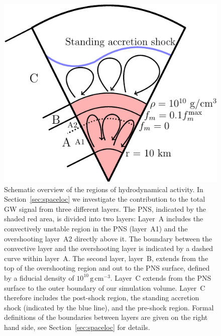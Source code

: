\begin{figure}
\includegraphics[width=0.99\linewidth]{./images/chp1/fig4.pdf}
\caption{Schematic overview of the regions of hydrodynamical activity. In
  Section~\ref{sec:spaceloc} we investigate the contribution to
  the total GW signal from three different layers. The PNS, indicated by
  the shaded red area, is divided into two layers: Layer~A includes
  the convectively unstable region in the PNS (layer~A1) and the overshooting
  layer~A2 directly above it. The boundary between the convective
  layer and the overshooting layer is indicated by a dashed curve
  within layer~A.
  The second layer, layer~B, extends from the
  top of the overshooting region and out to the PNS surface, defined
  by a fiducial density of $10^{10} \, \mathrm{g} \, \mathrm{cm}^{-3}$. Layer~C
  extends from the PNS surface to the outer boundary of our simulation
  volume. Layer~C therefore includes the post-shock region, the
  standing accretion shock (indicated by the blue line), and the
  pre-shock region. Formal definitions of the boundaries between
  layers are given on the right hand side, see
  Section~\ref{sec:spaceloc} for details.
\label{fig:PNSski}}
\end{figure}
